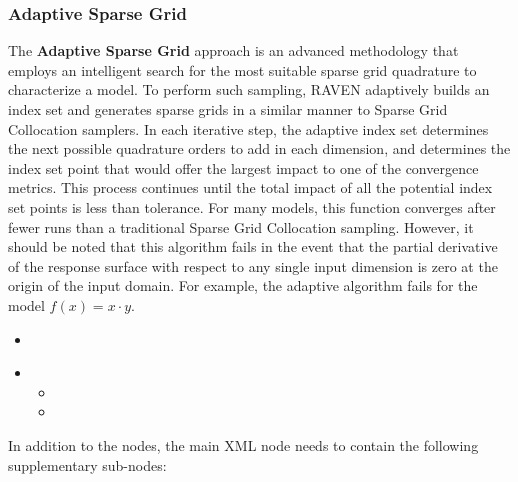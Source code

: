 \subsubsection{Adaptive Sparse Grid}
\label{subsubsubsec:AdaptiveSparseGrid}
The \textbf{Adaptive Sparse Grid} approach is an advanced methodology that employs
an intelligent search for the most suitable sparse grid quadrature to characterize a model.
%
To perform such sampling, RAVEN adaptively builds an index set and generates sparse grids
in a similar manner to Sparse Grid Collocation samplers.  In each iterative step, the adaptive
index set determines the next possible quadrature orders to add in each dimension, and
determines the index set point that would offer the largest impact to one of the convergence
metrics.  This process continues until the total impact of all the potential index set points is
less than tolerance.  For many models, this function converges after fewer runs than a traditional
Sparse Grid Collocation sampling.  However, it should be noted that this algorithm fails
in the event that the partial derivative of the response surface with respect to any single
input dimension is zero at the origin of the input domain.  For example, the adaptive
algorithm fails for the model $f(x)=x\cdot y$.
%

%
\attrIntro

\begin{itemize}
  \itemsep0em
  \item \nameDescription
\end{itemize}


\begin{itemize}
  \item \variableDescription
    \variableChildrenIntro
    \begin{itemize}
      \item \distributionDescription
    \item \functionDescription
    \end{itemize}
\end{itemize}

In addition to the  nodes, the main XML node
 needs to contain the following supplementary sub-nodes:

